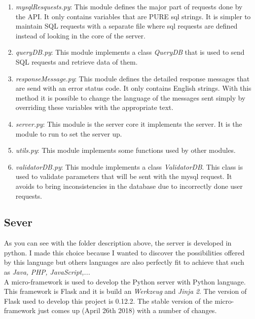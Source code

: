 
\begin{enumerate}
\item \textit{mysqlResquests.py}: This module defines the major part of requests done by the API. It only contains variables that are PURE sql strings. It is simpler to maintain SQL requests with a separate file where sql requests are defined instead of looking in the core of the server.
\item \textit{queryDB.py}: This module implements a class \textit{QueryDB} that is used to send SQL requests and retrieve data of them.
\item \textit{responseMessage.py}: This module defines the detailed response messages that are send with an error status code. It only contains English strings. With this method it is possible to change the language of the messages sent simply by overriding these variables with the appropriate text.
\item \textit{server.py}: This module is the server core it implements the server. It is the module to run to set the server up.
\item \textit{utils.py}: This module implements some functions used by other modules. 
\item \textit{validatorDB.py}: This module implements a class \textit{ValidatorDB}. This class is used to validate parameters that will be sent with the mysql request. It avoids to bring inconsistencies in the database due to incorrectly done user requests.
\end{enumerate}
\subsection{Sever}
As you can see with the folder description above, the server is developed in python. I made this choice because I wanted to discover the possibilities offered by this language but others languages are also perfectly fit to achieve that such as \textit{Java, PHP, JavaScript,...}\\

A micro-framework is used to develop the Python server with Python language. This framework is Flask and it is build an \textit{Werkzeug} and \textit{Jinja 2}. The version of Flask used to develop this project is 0.12.2. The stable version of the micro-framework just comes up (April 26th 2018) with a number of changes. \\

